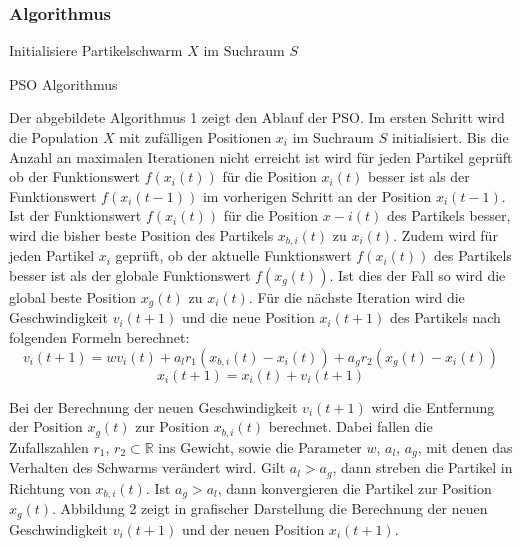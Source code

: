 \documentclass[a4paper, 11pt]{article}
\begin{document}
\subsubsection{Algorithmus}
\begin{framed}
	\begin{algorithm}[H]
		Initialisiere Partikelschwarm $X$ im Suchraum $S$\;
		\caption{\acs{PSO} Algorithmus}
		\label{psoalgo}
	\end{algorithm}
\end{framed}
Der abgebildete Algorithmus 1 zeigt den Ablauf der \acs{PSO}. Im ersten Schritt wird die Population $X$ mit zufälligen Positionen $x_{i}$ im Suchraum $S$ initialisiert. Bis die Anzahl an maximalen Iterationen nicht erreicht ist wird für jeden Partikel geprüft ob der Funktionswert $f(x_{i}(t))$ für die Position $x_{i}(t)$ besser ist als der Funktionswert $f(x_{i}(t-1))$ im vorherigen Schritt an der Position $x_{i}(t-1)$. Ist der Funktionswert $f(x_{i}(t))$ für die Position $x-{i}(t)$ des Partikels besser, wird die bisher beste Position des Partikels $x_{b,i}(t)$ zu $x_{i}(t)$. Zudem wird für jeden Partikel $x_{i}$ geprüft, ob der aktuelle Funktionswert $f(x_{i}(t))$ des Partikels besser ist als der globale Funktionswert $f(x_{g}(t))$. Ist dies der Fall so wird die global beste Position $x_{g}(t)$ zu $x_{i}(t)$.  Für die nächste Iteration wird die Geschwindigkeit $v_{i}(t+1)$ und die neue Position $x_{i}(t+1)$ des Partikels nach folgenden Formeln berechnet:
\begin{equation}
v_{i}(t+1) = wv_{i}(t) + a_{l}r_{1}(x_{b,i}(t) - x_{i}(t)) + a_{g}r_{2}(x_{g}(t) - x_{i}(t))
\end{equation} 
\begin{equation}
x_{i}(t+1) = x_{i}(t) + v_{i}(t+1)
\end{equation}
\par Bei der Berechnung der neuen Geschwindigkeit $v_{i}(t+1)$ wird die Entfernung der Position  $x_{g}(t)$ zur Position $x_{b,i}(t)$ berechnet. Dabei fallen die Zufallszahlen $r_{1}$, $r_{2} \subset \mathbb{R}$ ins Gewicht, sowie die Parameter $w$, $a_{l}$, $a_{g}$, mit denen das Verhalten des Schwarms verändert wird. Gilt $a_{l} > a_{g}$, dann streben die Partikel in Richtung von $x_{b,i}(t)$. Ist $a_{g} > a_{l}$, dann konvergieren die Partikel zur Position $x_{g}(t)$. Abbildung 2 zeigt in grafischer Darstellung die Berechnung der neuen Geschwindigkeit $v_{i}(t+1)$ und der neuen Position $x_{i}(t+1)$.\newline
\end{document}
